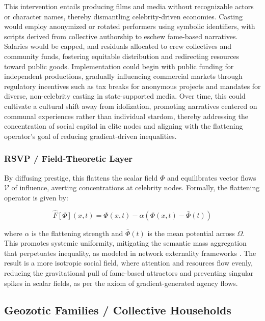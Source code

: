 \documentclass[11pt]{article}
\begin{document}
This intervention entails producing films and media without recognizable actors or character names, thereby dismantling celebrity-driven economies. Casting would employ anonymized or rotated performers using symbolic identifiers, with scripts derived from collective authorship to eschew fame-based narratives. Salaries would be capped, and residuals allocated to crew collectives and community funds, fostering equitable distribution and redirecting resources toward public goods. Implementation could begin with public funding for independent productions, gradually influencing commercial markets through regulatory incentives such as tax breaks for anonymous projects and mandates for diverse, non-celebrity casting in state-supported media. Over time, this could cultivate a cultural shift away from idolization, promoting narratives centered on communal experiences rather than individual stardom, thereby addressing the concentration of social capital in elite nodes and aligning with the flattening operator's goal of reducing gradient-driven inequalities.

\subsubsection{RSVP / Field-Theoretic Layer}

By diffusing prestige, this flattens the scalar field $\Phi$ and equilibrates vector flows $\mathcal{V}$ of influence, averting concentrations at celebrity nodes. Formally, the flattening operator is given by:

\begin{equation}
\hat{F}[\Phi](x, t) = \Phi(x, t) - \alpha \left( \Phi(x, t) - \bar{\Phi}(t) \right)
\end{equation}

where $\alpha$ is the flattening strength and $\bar{\Phi}(t)$ is the mean potential across $\Omega$. This promotes systemic uniformity, mitigating the semantic mass aggregation that perpetuates inequality, as modeled in network externality frameworks \citep{katz1985network}. The result is a more isotropic social field, where attention and resources flow evenly, reducing the gravitational pull of fame-based attractors and preventing singular spikes in scalar fields, as per the axiom of gradient-generated agency flows.

\subsection{Geozotic Families / Collective Households}
\end{document}
